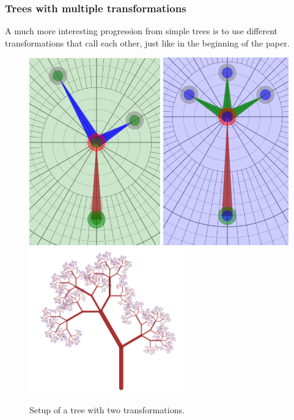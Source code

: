             \FloatBarrier

        \subsubsection{Trees with multiple transformations}

            A much more interesting progression from simple trees is to use different transformations that call each other, just like in the beginning of the paper.

            \begin{figure}[ht]
                \caption{\label{simple_tree_set_02} Setup of a tree with two transformations.}
                \centering
                \includegraphics[height=0.3\textwidth]{img/Simple_Techniques/Trees/tree_set_02.png}
                \includegraphics[height=0.3\textwidth]{img/Simple_Techniques/Trees/tree_set_03.png}  
                \includegraphics[width=0.6\textwidth]{img/Simple_Techniques/Trees/tree_12.png}          
            \end{figure}

